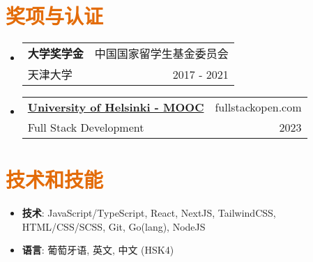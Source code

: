 \documentclass[a4paper, 20pt]{article}
\makeatletter
\newcommand{\resumeItem}[2]{
  \item\small{
    \textbf{#1}{: #2 \vspace{-2pt}}
  }
}
\newcommand{\resumeSubheading}[4]{
  \vspace{-1pt}\item
    \begin{tabular*}{0.97\textwidth}{l@{\extracolsep{\fill}}r}
      \textbf{#1} & #2 \\
      #3 & #4 \\
    \end{tabular*}\vspace{-5pt}
}
\newcommand{\resumeSubItem}[2]{\resumeItem{#1}{#2}\vspace{-3pt}}
\newcommand{\resumeSubHeadingListStart}{\begin{itemize}[leftmargin=*]}
\newcommand{\resumeSubHeadingListEnd}{\end{itemize}}
\makeatother
\begin{document}
\begin{CJK*}{UTF8}{gbsn}
\section{\textcolor[HTML]{E36C09}{\textbf{奖项与认证}}}
\resumeSubHeadingListStart{}
\resumeSubheading{大学奖学金}{中国国家留学生基金委员会}
{天津大学}{2017 - 2021}
\resumeSubheading{\href{https://studies.cs.helsinki.fi/stats/api/certificate/fullstackopen/en/c54941f0ecb4d052a3cf6982d1d27398}{University of Helsinki - MOOC}}{fullstackopen.com}
{Full Stack Development}{2023}
\resumeSubHeadingListEnd{}

\vspace{5pt}
\section{\textcolor[HTML]{E36C09}{\textbf{技术和技能}}}
	\resumeSubHeadingListStart{}
	  \resumeSubItem{技术}{\quad JavaScript/TypeScript, React, NextJS, TailwindCSS, HTML/CSS/SCSS, Git, Go(lang), NodeJS}
	  \resumeSubItem{语言}{\quad 葡萄牙语, 英文, 中文 (HSK4)}
  \resumeSubHeadingListEnd{}


\vspace{5pt}

\end{CJK*}
\end{document}
